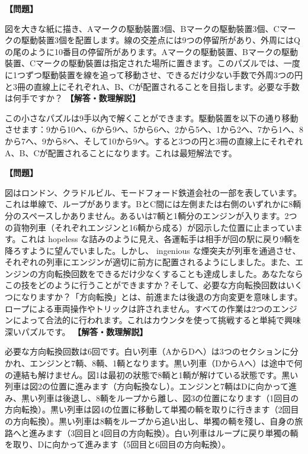 \documentclass[10pt,a4paper,oneside,openany]{ltjsbook}
\begin{document}
\begin{tcolorbox}[colback=softblue,colframe=primaryblue,title=\textbf{第 222 問：鉄道パズル （原題: A RAILWAY PUZZLE.）},arc=2mm,boxrule=1pt,breakable]
\textbf{【問題】}\par\vspace{0.3em}
図を大きな紙に描き、Aマークの駆動裝置3個、Bマークの駆動裝置3個、Cマークの駆動裝置3個を配置します。線の交差点には9つの停留所があり、外周にはQの尾のように10番目の停留所があります。Aマークの駆動裝置、Bマークの駆動裝置、Cマークの駆動裝置は指定された場所に置きます。このパズルでは、一度に1つずつ駆動裝置を線を追って移動させ、できるだけ少ない手数で外周3つの円と3冊の直線上にそれぞれA、B、Cが配置されることを目指します。必要な手数は何手ですか？
\tcblower
\textbf{【解答・数理解説】}\par\vspace{0.3em}
この小さなパズルは9手以內で解くことができます。駆動裝置を以下の通り移動させます：9から10へ、6から9へ、5から6へ、2から5へ、1から2へ、7から1へ、8から7へ、9から8へ、そして10から9へ。すると3つの円と3冊の直線上にそれぞれA、B、Cが配置されることになります。これは最短解法です。
\end{tcolorbox}

\begin{tcolorbox}[colback=softblue,colframe=primaryblue,title=\textbf{第 223 問：鉄路の難局 （原題: A RAILWAY MUDDLE.）},arc=2mm,boxrule=1pt,breakable]
\textbf{【問題】}\par\vspace{0.3em}
図はロンドン、クラドルビル、モードフォード鉄道会社の一部を表しています。これは単線で、ループがあります。BとC間には左側または右側のいずれかに8輌分のスペースしかありません。あるいは7輌と1輌分のエンジンが入ります。2つの貨物列車（それぞれエンジンと16輌から成る）が図示した位置に止まっています。これは hopeless な詰みのように見え、各運転手は相手が回の駅に戻り9輌を降ろすように望んでいました。しかし、 ingenious な煙突夫が列車を通過させ、それぞれの列車にエンジンが適切に前方に配置されるようにしました。また、エンジンの方向転換回数をできるだけ少なくすることも達成しました。あなたならこの技をどのように行うことができますか？そして、必要な方向転換回数はいくつになりますか？「方向転換」とは、前進または後退の方向変更を意味します。ロープによる車両操作やトリックは許されません。すべての作業は2つのエンジンによって合法的に行われます。これはカウンタを使って挑戦すると単純で興味深いパズルです。
\tcblower
\textbf{【解答・数理解説】}\par\vspace{0.3em}
必要な方向転換回数は6回です。白い列車（AからDへ）は3つのセクションに分かれ、エンジンと7輌、8輌、1輌となります。黒い列車（DからAへ）は途中で何の連結も解けません。図1は最初の狀態で8輌と1輌が解けている狀態です。黒い列車は図2の位置に進みます（方向転換なし）。エンジンと7輌はDに向かって進み、黒い列車は後退し、8輌をループから離し、図3の位置になります（1回目の方向転換）。黒い列車は図4の位置に移動して単獨の輌を取りに行きます（2回目の方向転換）。黒い列車は8輌をループから追い出し、単獨の輌を殘し、自身の旅路へと進みます（3回目と4回目の方向転換）。白い列車はループに戻り単獨の輌を取り、Dに向かって進みます（5回目と6回目の方向転換）。
\end{tcolorbox}
\end{document}
